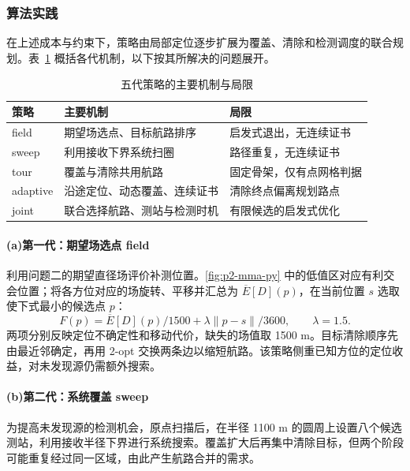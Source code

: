 \subsubsection{算法实践}
在上述成本与约束下，策略由局部定位逐步扩展为覆盖、清除和检测调度的联合规划。表~\ref{tab:q3-generations} 概括各代机制，以下按其所解决的问题展开。
\begin{table}[!htbp]\centering
\caption{五代策略的主要机制与局限}\label{tab:q3-generations}
\begin{tabular}{@{}lp{}p{}@{}}\toprule
策略 & 主要机制 & 局限\\\midrule
field & 期望场选点、目标航路排序 & 启发式退出，无连续证书\\
sweep & 利用接收下界系统扫圈 & 路径重复，无连续证书\\
tour & 覆盖与清除共用航路 & 固定骨架，仅有点网格判据\\
adaptive & 沿途定位、动态覆盖、连续证书 & 清除终点偏离规划路点\\
joint & 联合选择航路、测站与检测时机 & 有限候选的启发式优化\\\bottomrule
\end{tabular}\end{table}

\paragraph{\textbf{(a)}\hspace{0.2em}第一代：期望场选点 field}
利用问题二的期望直径场评价补测位置。\cref{fig:p2-mma-py} 中的低值区对应有利交会位置；将各方位对应的场旋转、平移并汇总为 $\overline E[D](p)$，在当前位置 $s$ 选取使下式最小的候选点 $p$：
\begin{equation}\label{eq:q3-field}
 F(p)=\overline E[D](p)/1500+\lambda\|p-s\|/3600,\qquad\lambda=1.5.
\end{equation}
两项分别反映定位不确定性和移动代价，缺失的场值取 1500 m。目标清除顺序先由最近邻确定，再用 2-opt\cite{croes1958} 交换两条边以缩短航路。该策略侧重已知方位的定位收益，对未发现源仍需额外搜索。

\paragraph{\textbf{(b)}\hspace{0.2em}第二代：系统覆盖 sweep}
为提高未发现源的检测机会，原点扫描后，在半径 1100 m 的圆周上设置八个候选测站，利用接收半径下界进行系统搜索。覆盖扩大后再集中清除目标，但两个阶段可能重复经过同一区域，由此产生航路合并的需求。

